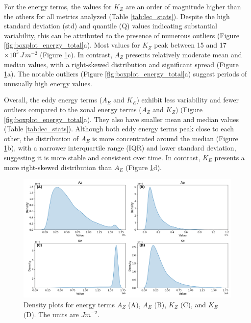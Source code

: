 For the energy terms, the values for $K_Z$ are an order of magnitude higher than the others for all metrics analyzed (Table \ref{tab:lec_stats}). Despite the high standard deviation (std) and quantile (Q) values indicating substantial variability, this can be attributed to the presence of numerous outliers (Figure \ref{fig:boxplot_energy_total}a). Most values for $K_Z$ peak between 15 and 17 $\times 10^5 \, J \, m^{-2}$ (Figure \ref{fig:ridge_plot_Energy_Terms_total}c). In contrast, $A_Z$ presents relatively moderate mean and median values, with a right-skewed distribution and significant spread (Figure \ref{fig:ridge_plot_Energy_Terms_total}a). The notable outliers (Figure \ref{fig:boxplot_energy_total}a) suggest periods of unusually high energy values.

Overall, the eddy energy terms ($A_E$ and $K_E$) exhibit less variability and fewer outliers compared to the zonal energy terms ($A_Z$ and $K_Z$) (Figure \ref{fig:boxplot_energy_total}a). They also have smaller mean and median values (Table \ref{tab:lec_stats}). Although both eddy energy terms peak close to each other, the distribution of $A_E$ is more concentrated around the median (Figure \ref{fig:ridge_plot_Energy_Terms_total}b), with a narrower interquartile range (IQR) and lower standard deviation, suggesting it is more stable and consistent over time. In contrast, $K_E$ presents a more right-skewed distribution than $A_E$ (Figure \ref{fig:ridge_plot_Energy_Terms_total}d).


\begin{figure}[!htbp]
\centering
\includegraphics[width=\textwidth]{figs_5/ridge_plot_Energy_Terms_total.png}
\caption[Density Plots - Energy Terms]{Density plots for energy terms $A_Z$ (A), $A_E$ (B), $K_Z$ (C), and $K_E$ (D). The units are $J m^{-2}$.}
\label{fig:ridge_plot_Energy_Terms_total}
\end{figure}

